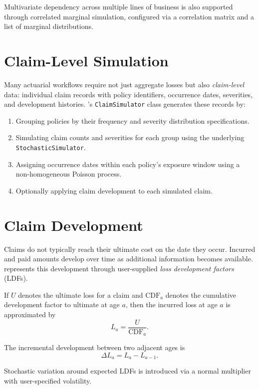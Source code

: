 Multivariate dependency across multiple lines of business is also
supported through correlated marginal simulation, configured via a
correlation matrix and a list of marginal distributions.

\section{Claim-Level Simulation}
\label{sec:claim_level}

Many actuarial workflows require not just aggregate losses but also
\emph{claim-level} data: individual claim records with policy identifiers,
occurrence dates, severities, and development histories. \actsim's
\texttt{ClaimSimulator} class generates these records by:

\begin{enumerate}[leftmargin=*]
    \item Grouping policies by their frequency and severity distribution
          specifications.
    \item Simulating claim counts and severities for each group using the
          underlying \texttt{StochasticSimulator}.
    \item Assigning occurrence dates within each policy's exposure window
          using a non-homogeneous Poisson process.
    \item Optionally applying claim development to each simulated claim.
\end{enumerate}

\section{Claim Development}
\label{sec:claim_development_concept}

Claims do not typically reach their ultimate cost on the date they occur.
Incurred and paid amounts develop over time as additional information
becomes available. \actsim represents this development through
user-supplied \emph{loss development factors} (LDFs).

If $U$ denotes the ultimate loss for a claim and $\mathrm{CDF}_a$ denotes
the cumulative development factor to ultimate at age $a$, then the
incurred loss at age $a$ is approximated by
\[
    L_a = \frac{U}{\mathrm{CDF}_a}.
\]

The incremental development between two adjacent ages is
\[
    \Delta L_a = L_a - L_{a-1}.
\]

Stochastic variation around expected LDFs is introduced via a normal
multiplier with user-specified volatility.

